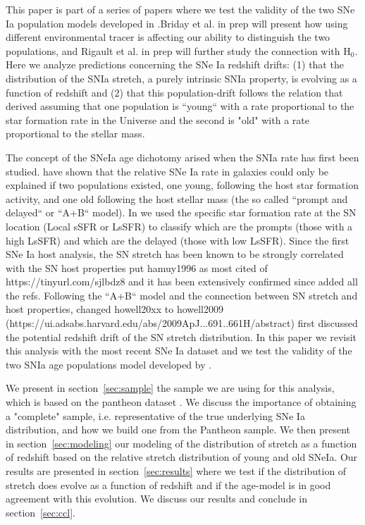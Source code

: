 \documentclass[]{aa} %
\newcommand{\nn}[1]{{\textcolor[rgb]{1, 0.27, 0}{#1}}}
\begin{document}
This paper is part of a series of papers where we test the validity of the two
SNe Ia population models developed in \citep{rigault2018}.Briday et al. in prep
will present how using different environmental tracer is affecting our ability
to distinguish the two populations, and Rigault et al. in prep will further
study the connection with H$_0$. Here we analyze predictions concerning the SNe
Ia redshift drifts: (1) that the distribution of the SNIa stretch, a purely
intrinsic SNIa property, is evolving as a function of redshift and (2) that this
population-drift follows the relation that \citep{rigault2018} derived assuming
that one population is “young“ with a rate proportional to the star formation
rate in the Universe and the second is "old" with a rate proportional to the
stellar mass.

The concept of the SNeIa age dichotomy arised when the SNIa rate has first been
studied. \cite{mannucci2005, scannapieco2005, sullivan2006, aubourg2008} have
shown that the relative SNe Ia rate in galaxies could only be explained if two
populations existed, one young, following the host star formation activity, and
one old following the host stellar mass (the so called “prompt and delayed“ or
“A+B“ model). In \cite{rigault2018} we used the specific star formation rate at
the SN location (Local sSFR or LsSFR) to classify which are the prompts (those
with a high LsSFR) and which are the delayed (those with low LsSFR). Since the
first SNe Ia host analysis, the SN stretch has been known to be strongly
correlated with the SN host properties \citep{hamuy1996, hamuy2000} \nn{put
hamuy1996 as most cited of https://tinyurl.com/sjlbdz8} and it has been
extensively confirmed since \citep[e.g.][]{neill2009, sullivan2010,
lampeitl2010, kelly2010, gupta2011, dandrea2011, childress2013, rigault2013,
pan2014} \nn{added all the refs}. Following the “A+B“ model and the connection
between SN stretch and host properties, \citep{howell2009} \nn{changed
howell20xx to howell2009
(https://ui.adsabs.harvard.edu/abs/2009ApJ...691..661H/abstract)} first
discussed the potential redshift drift of the SN stretch distribution. In this
paper we revisit this analysis with the most recent SNe Ia dataset and we test
the validity of the two SNIa age populations model developed by
\citep{rigault2018}.

We present in section~\ref{sec:sample} the sample we are using for this
analysis, which is based on the pantheon dataset \citep{scolnic2018a}. We
discuss the importance of obtaining a "complete" sample, i.e. representative of
the true underlying SNe Ia distribution, and how we build one from the Pantheon
sample.  We then present in section~\ref{sec:modeling} our modeling of the
distribution of stretch as a function of redshift based on the relative stretch
distribution of young and old SNeIa. Our results are presented in
section~\ref{sec:results} where we test if the distribution of stretch does
evolve as a function of redshift and if the age-model is in good agreement with
this evolution. We discuss our results and conclude in section~\ref{sec:ccl}.
\end{document}
